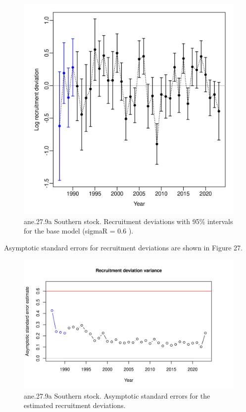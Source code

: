 \documentclass[
]{article}
\begin{document}
\begin{figure}[H]

{\centering \includegraphics[width=0.95\linewidth]{report/run/S1.0_4FLEETS_SelECO_RecIndex_Mnewfix/fig_Recdevs} 

}

\caption{ane.27.9a Southern stock. Recruitment deviations with 95\% intervals for the base model (sigmaR = 0.6 ).}\label{fig:unnamed-chunk-32}
\end{figure}

Asymptotic standard errors for recruitment deviations are shown in
Figure 27.

\begin{figure}[H]

{\centering \includegraphics[width=0.95\linewidth]{report/run/S1.0_4FLEETS_SelECO_RecIndex_Mnewfix/fig_recdevs2_varcheck} 

}

\caption{ane.27.9a Southern stock. Asymptotic standard errors for the estimated recruitment deviations.}\label{fig:unnamed-chunk-33}
\end{figure}
\end{document}
